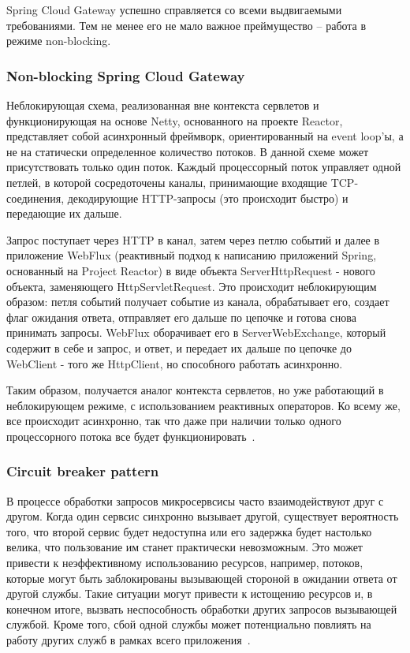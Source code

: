 Spring Cloud Gateway успешно справляется со всеми выдвигаемыми требованиями.
Тем не менее его не мало важное преймущество -- работа в режиме non-blocking.

\subsubsection{Non-blocking Spring Cloud Gateway}

Неблокирующая схема, реализованная вне контекста сервлетов и функционирующая на основе Netty,
основанного на проекте Reactor, представляет собой асинхронный фреймворк, ориентированный на event
loop'ы, а не на статически определенное количество потоков.
В данной схеме может
присутствовать только один поток.
Каждый процессорный поток управляет одной петлей, в которой
сосредоточены каналы, принимающие входящие TCP-соединения, декодирующие HTTP-запросы (это происходит
быстро) и передающие их дальше.

Запрос поступает через HTTP в канал, затем через петлю событий и далее в приложение WebFlux (реактивный подход к написанию приложений Spring, основанный на Project Reactor) в виде объекта
ServerHttpRequest - нового объекта, заменяющего HttpServletRequest.
Это происходит неблокирующим
образом: петля событий получает событие из канала, обрабатывает его, создает флаг ожидания
ответа, отправляет его дальше по цепочке и готова снова принимать запросы.
WebFlux оборачивает его в
ServerWebExchange, который содержит в себе и запрос, и ответ, и передает их дальше по цепочке до
WebClient - того же HttpClient, но способного работать асинхронно.

Таким образом, получается аналог контекста сервлетов, но уже работающий в неблокирующем режиме, с
использованием реактивных операторов.
Ко всему же, все происходит асинхронно, так что даже при
наличии только одного процессорного потока все будет
функционировать~\cite{spirng_gateway}.

\subsubsection{Circuit breaker pattern}

В процессе обработки запросов микросервсисы часто взаимодействуют друг с другом.
Когда один сервсис
синхронно вызывает другой, существует вероятность того, что второй сервис будет недоступна или его
задержка будет настолько велика, что пользование им станет практически невозможным.
Это может
привести к неэффективному использованию ресурсов, например, потоков, которые могут быть
заблокированы вызывающей стороной в ожидании ответа от другой службы.
Такие ситуации могут привести
к истощению ресурсов и, в конечном итоге, вызвать неспособность обработки других запросов вызывающей
службой.
Кроме того, сбой одной службы может потенциально повлиять на работу других служб в рамках
всего приложения~\cite{circuit_breaker}.

